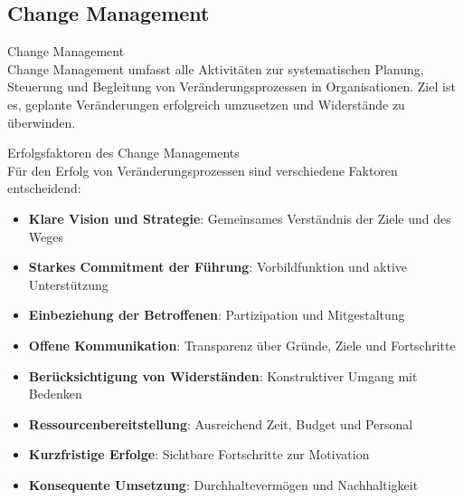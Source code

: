 \subsection{Change Management}

\begin{definition}{Change Management}\\
Change Management umfasst alle Aktivitäten zur systematischen Planung, Steuerung und Begleitung von Veränderungsprozessen in Organisationen. Ziel ist es, geplante Veränderungen erfolgreich umzusetzen und Widerstände zu überwinden.
\end{definition}

\begin{concept}{Erfolgsfaktoren des Change Managements}\\
Für den Erfolg von Veränderungsprozessen sind verschiedene Faktoren entscheidend:
\begin{itemize}
    \item \textbf{Klare Vision und Strategie}: Gemeinsames Verständnis der Ziele und des Weges
    \item \textbf{Starkes Commitment der Führung}: Vorbildfunktion und aktive Unterstützung
    \item \textbf{Einbeziehung der Betroffenen}: Partizipation und Mitgestaltung
    \item \textbf{Offene Kommunikation}: Transparenz über Gründe, Ziele und Fortschritte
    \item \textbf{Berücksichtigung von Widerständen}: Konstruktiver Umgang mit Bedenken
    \item \textbf{Ressourcenbereitstellung}: Ausreichend Zeit, Budget und Personal
    \item \textbf{Kurzfristige Erfolge}: Sichtbare Fortschritte zur Motivation
    \item \textbf{Konsequente Umsetzung}: Durchhaltevermögen und Nachhaltigkeit
\end{itemize}
\end{concept}

